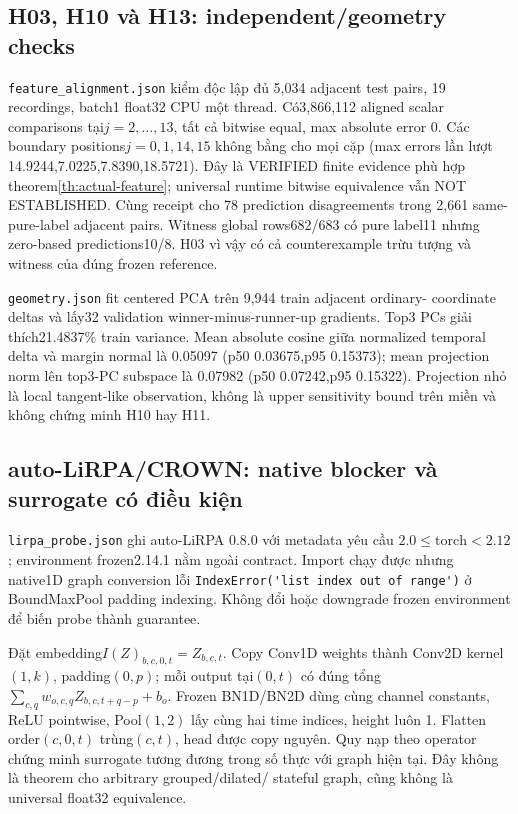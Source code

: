\documentclass[11pt,a4paper]{article}
\newcommand{\code}[1]{{\small\ttfamily\nolinkurl{#1}}}
\theoremstyle{remark}
\begin{document}
\subsection{H03, H10 và H13: independent/geometry checks}
\code{feature_alignment.json} kiểm độc lập đủ 5,034 adjacent test pairs,
19 recordings, batch1 float32 CPU một thread. Có3,866,112 aligned scalar
comparisons tại$j=2,\ldots,13$, tất cả bitwise equal, max absolute error 0.
Các boundary positions$j=0,1,14,15$ không bằng cho mọi cặp (max errors lần
lượt 14.9244,7.0225,7.8390,18.5721). Đây là VERIFIED finite evidence phù
hợp theorem\ref{th:actual-feature}; universal runtime bitwise equivalence
vẫn NOT ESTABLISHED. Cùng receipt cho 78 prediction disagreements trong
2,661 same-pure-label adjacent pairs. Witness global rows682/683 có pure
label11 nhưng zero-based predictions10/8. H03 vì vậy có cả counterexample
trừu tượng và witness của đúng frozen reference.

\code{geometry.json} fit centered PCA trên 9,944 train adjacent ordinary-
coordinate deltas và lấy32 validation winner-minus-runner-up gradients.
Top3 PCs giải thích21.4837\% train variance. Mean absolute cosine giữa
normalized temporal delta và margin normal là 0.05097 (p50 0.03675,p95 0.15373);
mean projection norm lên top3-PC subspace là 0.07982
(p50 0.07242,p95 0.15322). Projection nhỏ là local tangent-like observation,
không là upper sensitivity bound trên miền và không chứng minh H10 hay H11.

\subsection{auto-LiRPA/CROWN: native blocker và surrogate có điều kiện}
\code{lirpa_probe.json} ghi auto-LiRPA 0.8.0 với metadata yêu cầu
$2.0\le\mathrm{torch}<2.12$; environment frozen2.14.1 nằm ngoài contract.
Import chạy được nhưng native1D graph conversion lỗi
\code{IndexError('list index out of range')} ở BoundMaxPool padding indexing.
Không đổi hoặc downgrade frozen environment để biến probe thành guarantee.

Đặt embedding$I(Z)_{b,c,0,t}=Z_{b,c,t}$. Copy Conv1D weights thành
Conv2D kernel$(1,k)$, padding$(0,p)$; mỗi output tại$(0,t)$ có đúng tổng
$\sum_{c,q}w_{o,c,q}Z_{b,c,t+q-p}+b_o$. Frozen BN1D/BN2D dùng cùng
channel constants, ReLU pointwise, Pool$(1,2)$ lấy cùng hai time indices,
height luôn 1. Flatten order$(c,0,t)$ trùng$(c,t)$, head được copy nguyên.
Quy nạp theo operator chứng minh surrogate tương đương trong số thực
với graph hiện tại. Đây không là theorem cho arbitrary grouped/dilated/
stateful graph, cũng không là universal float32 equivalence.
\end{document}
